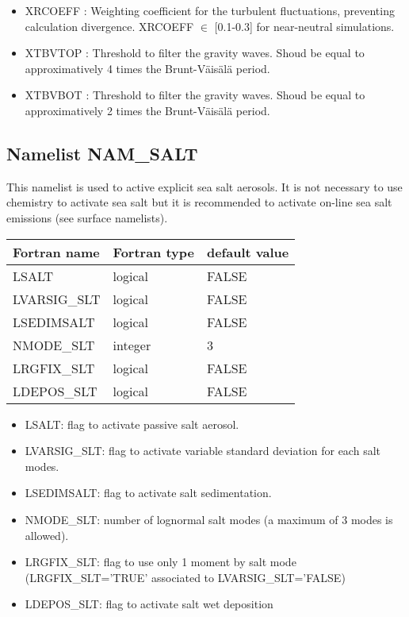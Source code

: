 \begin{itemize}
\item XRCOEFF : Weighting coefficient for the turbulent fluctuations, preventing calculation divergence. XRCOEFF $\in$ [0.1-0.3] for near-neutral simulations.

\item XTBVTOP : Threshold to filter the gravity waves. Shoud be equal to approximatively 4 times the Brunt-V{\"a}is{\"a}l{\"a} period.

\item XTBVBOT : Threshold to filter the gravity waves. Shoud be equal to approximatively 2 times the Brunt-V{\"a}is{\"a}l{\"a} period.
  
\end{itemize}
\subsection{Namelist NAM\_SALT }
%
This namelist is used to active explicit sea salt aerosols. 
It is not necessary to use chemistry to activate sea salt but it is recommended to activate on-line sea salt emissions (see surface namelists).


\begin{center}
\begin{tabular} {|l|l|l|}
\hline
Fortran name & Fortran type & default value \\
\hline
LSALT       & logical  & FALSE  \\
LVARSIG\_SLT& logical  & FALSE  \\
LSEDIMSALT  & logical  & FALSE  \\
NMODE\_SLT  & integer  &  3  \\
LRGFIX\_SLT & logical  & FALSE  \\
LDEPOS\_SLT & logical  & FALSE  \\
\hline
\end{tabular}
\end{center}

\begin{itemize}

\item LSALT: flag to activate passive salt aerosol.
\item LVARSIG\_SLT: flag to activate variable standard deviation for each salt modes.
\item LSEDIMSALT: flag to activate salt sedimentation.
\item  NMODE\_SLT: number of lognormal salt modes (a maximum of 3 modes is allowed).
\item LRGFIX\_SLT: flag to use only 1 moment by salt mode (LRGFIX\_SLT='TRUE' associated to LVARSIG\_SLT='FALSE)
\item LDEPOS\_SLT: flag to activate salt wet deposition  
\end{itemize}
